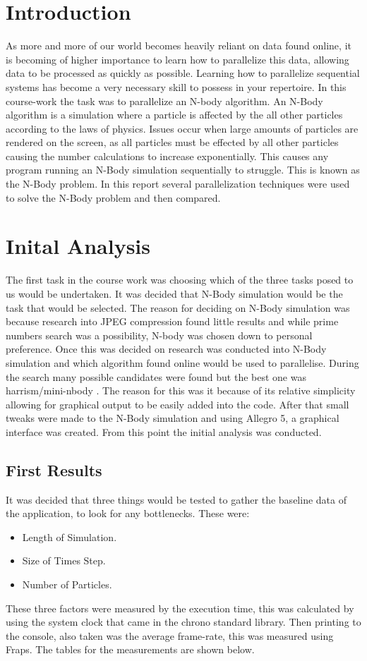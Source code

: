 \documentclass[12pt]{article}
\begin{document}
\section{Introduction}
As more and more of our world becomes heavily reliant on data found online, it is  becoming of higher importance to learn how to parallelize this data, allowing data to be processed as quickly as possible.  Learning how to parallelize sequential systems has become a very necessary skill to possess in your repertoire. 
\newline 
In this course-work the task was to parallelize an N-body algorithm. An N-Body algorithm is a simulation where a particle is affected by the all other particles according to the laws of physics. Issues occur when large amounts of particles are rendered on the screen, as all particles must be effected by all other particles causing the number calculations to increase exponentially. This causes any program running an N-Body simulation sequentially to struggle. This is known as the N-Body problem. In this report several parallelization techniques were used to solve the N-Body problem and then compared.

\section{Inital Analysis}
The first task in the course work was choosing which of the three tasks posed to us would be undertaken. It was decided that N-Body simulation would be the task that would be selected. The reason for deciding on N-Body simulation was because research into JPEG compression found little results and while prime numbers search was a possibility, N-body was chosen down to personal preference.
\newline 
Once this was decided on research was conducted into N-Body simulation and which algorithm found online would be used to parallelise. During the search many possible candidates were found but the best one was harrism/mini-nbody . The reason for this was it because of its relative simplicity allowing for graphical output to be easily added into the code. After that small tweaks were made to the N-Body simulation and using Allegro 5, a graphical interface was created. From this point the initial analysis was conducted.
\subsection{First Results}
It was decided that three things would be tested to gather the baseline data of the application, to look for any bottlenecks. These were:
\begin{itemize}
 \item Length of Simulation.
 \item Size of Times Step.
  \item Number of Particles. 
\end{itemize}
These three factors were measured by the execution time, this was calculated by  using the system clock that came in the chrono standard library. Then printing to the console, also taken was the average frame-rate, this was measured using Fraps. The tables for the measurements are shown below.
\end{document}
